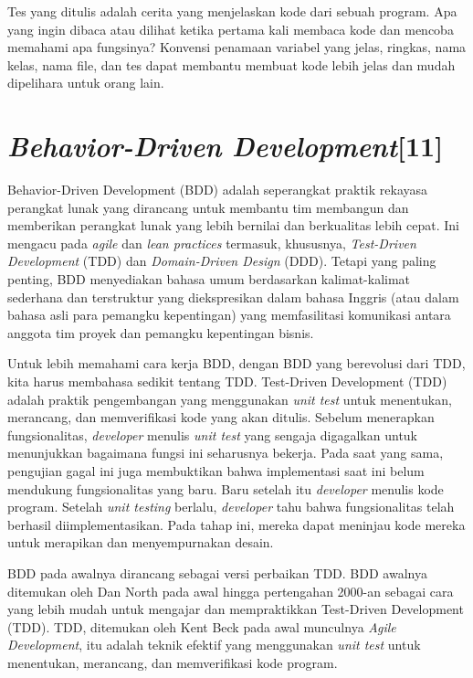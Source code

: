 Tes yang ditulis adalah cerita yang menjelaskan kode dari sebuah program. Apa yang ingin dibaca atau dilihat ketika pertama kali membaca kode dan mencoba memahami apa fungsinya? Konvensi penamaan variabel yang jelas, ringkas, nama kelas, nama file, dan tes dapat membantu membuat kode lebih jelas dan mudah dipelihara untuk orang lain.

\section{\textit{Behavior-Driven Development}[11]}
Behavior-Driven Development (BDD) adalah seperangkat praktik rekayasa perangkat lunak yang dirancang untuk membantu tim membangun dan memberikan perangkat lunak yang lebih bernilai dan berkualitas lebih cepat. Ini mengacu pada \textit{agile} dan \textit{lean practices} termasuk, khususnya, \textit{Test-Driven Development} (TDD) dan \textit{Domain-Driven Design} (DDD). Tetapi yang paling penting, BDD menyediakan bahasa umum berdasarkan kalimat-kalimat sederhana dan terstruktur yang diekspresikan dalam bahasa Inggris (atau dalam bahasa asli para pemangku kepentingan) yang memfasilitasi komunikasi antara anggota tim proyek dan pemangku kepentingan bisnis.

Untuk lebih memahami cara kerja BDD, dengan BDD yang berevolusi dari TDD, kita harus membahasa sedikit tentang TDD. Test-Driven Development (TDD) adalah praktik pengembangan yang menggunakan \textit{unit test} untuk menentukan, merancang, dan memverifikasi kode yang akan ditulis. Sebelum menerapkan fungsionalitas, \textit{developer} menulis \textit{unit test} yang sengaja digagalkan untuk menunjukkan bagaimana fungsi ini seharusnya bekerja. Pada saat yang sama, pengujian gagal ini juga membuktikan bahwa implementasi saat ini belum mendukung fungsionalitas yang baru. Baru setelah itu \textit{developer} menulis kode program. Setelah \textit{unit testing} berlalu, \textit{developer} tahu bahwa fungsionalitas telah berhasil diimplementasikan. Pada tahap ini, mereka dapat meninjau kode mereka untuk merapikan dan menyempurnakan desain.

BDD pada awalnya dirancang sebagai versi perbaikan TDD. BDD awalnya ditemukan oleh Dan North pada awal hingga pertengahan 2000-an sebagai cara yang lebih mudah untuk mengajar dan mempraktikkan Test-Driven Development (TDD). TDD, ditemukan oleh Kent Beck pada awal munculnya \textit{Agile Development}, itu adalah teknik efektif yang menggunakan \textit{unit test} untuk menentukan, merancang, dan memverifikasi kode program.

